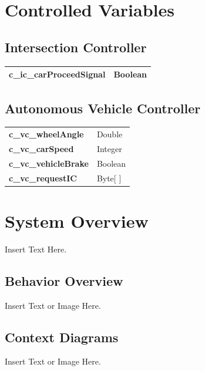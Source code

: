 \documentclass [10pt]{article}
\begin{document}

\section{Controlled Variables}


\subsection{Intersection Controller}

\begin{longtable}{ |p{ }  p{ }|}  \hline

\textbf{c\_ic\_carProceedSignal} & Boolean \\ \hline
\end{longtable}

\subsection{Autonomous Vehicle Controller}

\begin{longtable}{ |p{ }  p{ }|}  \hline
\textbf{c\_vc\_wheelAngle} & Double  \\

\cellcolor{tableCell}\textbf{c\_vc\_carSpeed}  & \cellcolor{tableCell}Integer \\ 

\textbf{c\_vc\_vehicleBrake} & Boolean \\ 

\cellcolor{tableCell}\textbf{c\_vc\_requestIC}  & \cellcolor{tableCell}Byte[ ]\\ \hline
\end{longtable}



\section{System Overview}
Insert Text Here. 

\subsection{Behavior Overview}
Insert Text or Image Here. 

\subsection{Context Diagrams}
Insert Text or Image Here.
\end{document}
